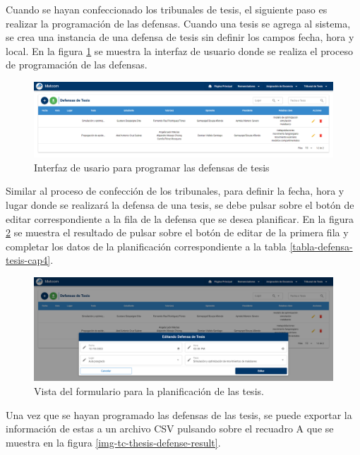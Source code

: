 Cuando se hayan confeccionado los tribunales de tesis, el siguiente paso 
es realizar la programación de las defensas. 
Cuando una tesis se agrega al sistema, se crea una instancia 
de una defensa de tesis sin definir los campos fecha, hora y local.
En la figura \ref{img-tc-thesis-defense-empty} se muestra la interfaz de usuario donde se realiza 
el proceso de programación de las defensas.

\begin{figure}[H]
    \includegraphics[scale=0.3]{Graphics/Implementation/Tesis/thesis-defense-empty.png}
    \caption{Interfaz de usario para programar las defensas de tesis}
    \label{img-tc-thesis-defense-empty}
\end{figure}

Similar al proceso de confección de los tribunales, para definir la fecha, hora y lugar 
donde se realizará la defensa de una tesis, se debe pulsar sobre el botón de editar correspondiente 
a la fila de la defensa que se desea planificar. En la figura \ref{img-tc-thesis-defense-form}
se muestra el resultado de pulsar sobre el botón de editar de la primera fila
y completar los datos de la planificación correspondiente a la tabla \ref{tabla-defensa-tesis-cap4}. 


\begin{figure}[H]
    \includegraphics[scale=0.3]{Graphics/Implementation/Tesis/thesis-defense-form.png}
    \caption{Vista del formulario para la planificación de las tesis.}
    \label{img-tc-thesis-defense-form}
\end{figure}


Una vez que se hayan programado las defensas de las tesis, se puede 
exportar la información de estas a un archivo CSV pulsando sobre el recuadro A que se 
muestra en la figura \ref{img-tc-thesis-defense-result}.


